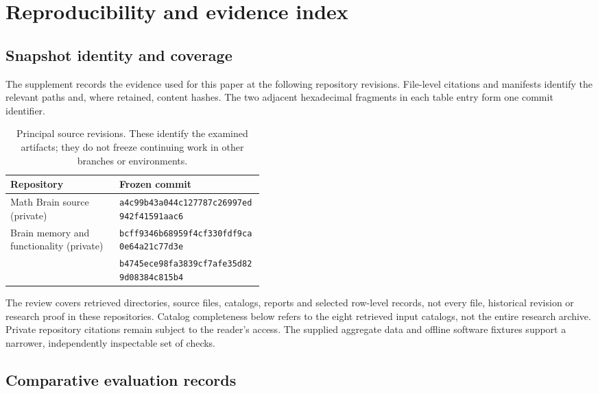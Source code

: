 \section{Reproducibility and evidence index}
\label{app:reproducibility}

\subsection{Snapshot identity and coverage}

The supplement records the evidence used for this paper at the following repository revisions. File-level citations and manifests identify the relevant paths and, where retained, content hashes. The two adjacent hexadecimal fragments in each table entry form one commit identifier.

\begin{table}[htbp]
\centering\small
\begin{tabularx}{\linewidth}{p{0.43\linewidth}Y}
\toprule
Repository & Frozen commit\\
\midrule
Math Brain source (private) &
\texttt{a4c99b43a044c127787c}\allowbreak\texttt{26997ed942f41591aac6}\\
Brain memory and functionality (private) &
\texttt{bcff9346b68959f4cf33}\allowbreak\texttt{0fdf9ca0e64a21c77d3e}\\
 &
\texttt{b4745ece98fa3839cf7a}\allowbreak\texttt{fe35d829d08384c815b4}\\
\bottomrule
\end{tabularx}
\caption{Principal source revisions. These identify the examined artifacts; they do not freeze continuing work in other branches or environments.}
\end{table}

The review covers retrieved directories, source files, catalogs, reports and selected row-level records, not every file, historical revision or research proof in these repositories. Catalog completeness below refers to the eight retrieved input catalogs, not the entire research archive. Private repository citations remain subject to the reader's access. The supplied aggregate data and offline software fixtures support a narrower, independently inspectable set of checks.

\subsection{Comparative evaluation records}

